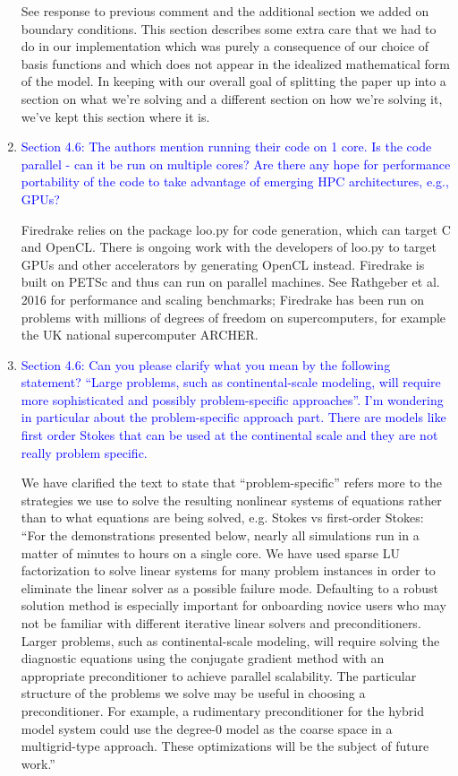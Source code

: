\documentclass{article}
\theoremstyle{definition}
\theoremstyle{plain}
\begin{document}
\begin{enumerate}
See response to previous comment and the additional section we added on boundary conditions.
This section describes some extra care that we had to do in our implementation which was purely a consequence of our choice of basis functions and which does not appear in the idealized mathematical form of the model.
In keeping with our overall goal of splitting the paper up into a section on what we're solving and a different section on how we're solving it, we've kept this section where it is.

\item \textcolor{blue}{Section 4.6: The authors mention running their code on 1 core. Is the code parallel - can it be run
on multiple cores? Are there any hope for performance portability of the code to take advantage of
emerging HPC architectures, e.g., GPUs?}

Firedrake relies on the package loo.py for code generation, which can target C and OpenCL.
There is ongoing work with the developers of loo.py to target GPUs and other accelerators by generating OpenCL instead.
Firedrake is built on PETSc and thus can run on parallel machines.
See Rathgeber et al. 2016 for performance and scaling benchmarks; Firedrake has been run on problems with millions of degrees of freedom on supercomputers, for example the UK national supercomputer ARCHER.

\item \textcolor{blue}{Section 4.6: Can you please clarify what you mean by the following statement? ``Large problems,
such as continental-scale modeling, will require more sophisticated and possibly problem-specific
approaches''. I’m wondering in particular about the problem-specific approach part. There are
models like first order Stokes that can be used at the continental scale and they are not really
problem specific.}

We have clarified the text to state that ``problem-specific'' refers more to the strategies we use to solve the resulting nonlinear systems of equations rather than to what equations are being solved, e.g. Stokes vs first-order Stokes:
``For the demonstrations presented below, nearly all simulations run in a matter of minutes to hours on a single core.
We have used sparse LU factorization to solve linear systems for many problem instances in order to eliminate the linear solver as a possible failure mode.
Defaulting to a robust solution method is especially important for onboarding novice users who may not be familiar with different iterative linear solvers and preconditioners.
Larger problems, such as continental-scale modeling, will require solving the diagnostic equations using the conjugate gradient method with an appropriate preconditioner to achieve parallel scalability.
The particular structure of the problems we solve may be useful in choosing a preconditioner.
For example, a rudimentary preconditioner for the hybrid model system could use the degree-0 model as the coarse space in a multigrid-type approach.
These optimizations will be the subject of future work.''


\end{enumerate}
\end{document}
